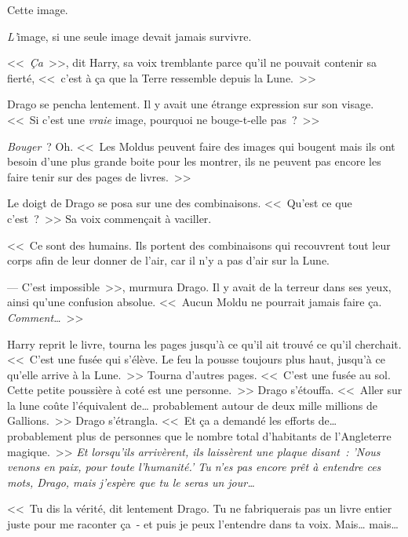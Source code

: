 Cette image.

\emph{L'}image, si une seule image devait jamais survivre.

<<~\emph{Ça}~>>, dit Harry, sa voix tremblante parce qu'il ne pouvait contenir sa fierté, <<~c'est à ça que la Terre ressemble depuis la Lune.~>>

Drago se pencha lentement. Il y avait une étrange expression sur son visage. <<~Si c'est une \emph{vraie} image, pourquoi ne bouge-t-elle pas~?~>>

\emph{Bouger}~? Oh. <<~Les Moldus peuvent faire des images qui bougent mais ils ont besoin d'une plus grande boite pour les montrer, ils ne peuvent pas encore les faire tenir sur des pages de livres.~>>

Le doigt de Drago se posa sur une des combinaisons. <<~Qu'est ce que c'est~?~>> Sa voix commençait à vaciller.

<<~Ce sont des humains. Ils portent des combinaisons qui recouvrent tout leur corps afin de leur donner de l'air, car il n'y a pas d'air sur la Lune.

--- C'est impossible~>>, murmura Drago. Il y avait de la terreur dans ses yeux, ainsi qu'une confusion absolue. <<~Aucun Moldu ne pourrait jamais faire ça. \emph{Comment…}~>>

Harry reprit le livre, tourna les pages jusqu'à ce qu'il ait trouvé ce qu'il cherchait. <<~C'est une fusée qui s'élève. Le feu la pousse toujours plus haut, jusqu'à ce qu'elle arrive à la Lune.~>> Tourna d'autres pages. <<~C'est une fusée au sol. Cette petite poussière à coté est une personne.~>> Drago s'étouffa. <<~Aller sur la lune coûte l'équivalent de… probablement autour de deux mille millions de Gallions.~>> Drago s'étrangla. <<~Et ça a demandé les efforts de… probablement plus de personnes que le nombre total d'habitants de l'Angleterre magique.~>> \emph{Et lorsqu'ils arrivèrent, ils laissèrent une plaque disant~: 'Nous venons en paix, pour toute l'humanité.' Tu n'es pas encore prêt à entendre ces mots, Drago, mais j'espère que tu le seras un jour…}

<<~Tu dis la vérité, dit lentement Drago. Tu ne fabriquerais pas un livre entier juste pour me raconter ça~- et puis je peux l'entendre dans ta voix. Mais… mais…

